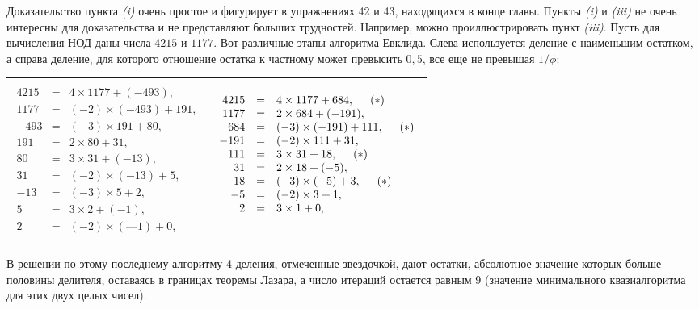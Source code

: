 \begin{myproof}
Доказательство пункта \textit{(i)} очень простое и фигурирует в упражне­ниях 42 и 43, находящихся в конце главы. Пункты \textit{(i)} и \textit{(iii)} не очень
интересны для доказательства и не представляют больших трудно­стей. Например, можно проиллюстрировать пункт \textit{(iii)}. Пусть для
вычисления НОД даны числа $4215$ и $1177$. Вот различные этапы ал­горитма Евклида. Слева используется деление с наименьшим остат­ком, а справа деление, для которого отношение остатка к частному
может превысить $0,5$, все еще не превышая $1/\phi$:

\begin{tabular}{c|c}

$\begin{array}{rcl}
\;\\
4215 & = & 4 \times 1177 + (-493),\\
1177 & = & (-2 )\times(-493)+191,\\
-493 & = & (-3)\times 191+80,\\
191  & = & 2\times 80+31,\\
80   & = & 3\times 31+(-13),\\
31   & = & (-2)\times(-13)+5,\\
-13  & = &(-3)\times 5+2,\\
5    & = & 3\times 2+(-1),\\
2    & = & (-2)\times(—1)+0,\\
\;
\end{array}$ &
$\begin{array}{rcl}
\;\\
4215 &=& 4 \times 1177 + 684,\hspace*{0.5cm}(*)\\
1177 &=& 2\times 684 + (-191),\\
684 & = & (-3)\times (-191)+111,\hspace*{0.5cm}(*)\\
-191  & = & (-2)\times 111+31,\\
111 & = & 3\times 31+18,\hspace*{0.5cm}(*)\\
31   & = & 2\times 18+(-5),\\
18  & = &(-3)\times(-5)+3,\hspace*{0.5cm}(*)\\
-5    & = & (-2)\times 3+1,\\
2    & = & 3\times1+0,\\
\;
\end{array}$
\end{tabular}
В решении по этому последнему алгоритму 4 деления, отмеченные
звездочкой, дают остатки, абсолютное значение которых больше
половины делителя, оставаясь в границах теоремы Лазара, а число
итераций остается равным 9 (значение минимального квазиалгоритма для этих двух целых чисел).
\end{myproof}
